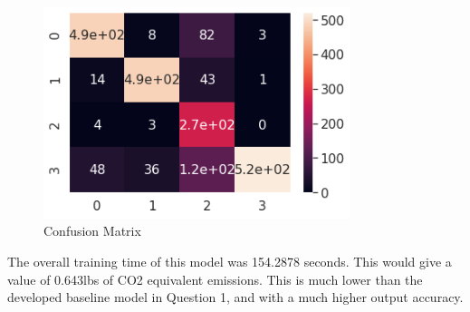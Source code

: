 \begin{figure}[H]
	\centering
	\includegraphics[width=0.8\textwidth]{images/q2/matrix}
	\caption{Confusion Matrix}
	\label{fig:q2matrix}
\end{figure}

The overall training time of this model was 154.2878 seconds. This would give a
value of 0.643lbs of CO2 equivalent emissions. This is much lower than the
developed baseline model in Question 1, and with a much higher output accuracy.
